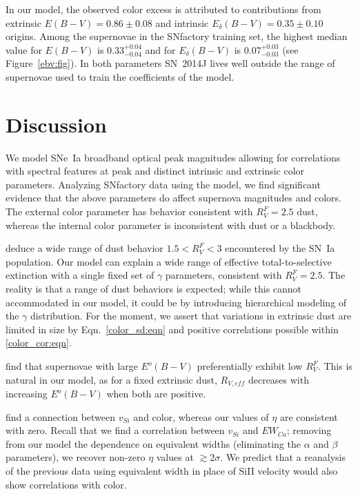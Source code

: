 \documentclass{aastex}   	%
\begin{document}
In our model, the observed color excess is attributed to contributions from extrinsic
$E(B-V)=  0.86 \pm   0.08$ and intrinsic $E_\delta(B-V)=  0.35 \pm   0.10$ origins.
Among the supernovae in the SNfactory training set, the highest median value for 
$E(B-V)$ is $  0.33^{  +0.04}_{ -0.04}$ and for $E_\delta(B-V)$ is
$  0.07^{  +0.03}_{ -0.03}$ 
(see Figure~\ref{ebv:fig}).
In both parameters SN~2014J lives well outside the range of supernovae used to train the coefficients of the model.

\section{Discussion}
\label{discussion:sec}
We model SNe~Ia broadband optical peak magnitudes allowing for correlations with spectral features at peak and distinct intrinsic and
extrinsic color parameters.  Analyzing SNfactory data using the model, we find significant evidence that the above parameters do
affect supernova magnitudes and colors.  The external color parameter has behavior consistent with $R^F_V=2.5$ \citet{1999PASP..111...63F} dust,
whereas the internal color parameter is inconsistent with dust or a blackbody.

\citet{2014ApJ...789...32B, 2015MNRAS.453.3300A} deduce a wide range of dust behavior $1.5<R^F_V<3$ encountered by the SN~Ia population.
Our model can explain a wide range of effective total-to-selective extinction with a single fixed set of $\gamma$ parameters, consistent
with $R^F_V=2.5$.  The reality is that a range of dust behaviors is expected; while this cannot accommodated in our model, it could be by
introducing hierarchical 
modeling of the $\gamma$ distribution.
For the moment, we assert that variations in extrinsic dust are limited in
size by Eqn.~\ref{color_sd:eqn} and positive correlations possible within \ref{color_cor:eqn}.


\citet{2011ApJ...729...55F, 2014ApJ...789...32B, 2015MNRAS.453.3300A} find that supernovae with large $E^o(B-V)$ 
preferentially exhibit low $R^F_V$.  This is natural in our model, as for a fixed extrinsic dust, $R_{V,eff}$ decreases with increasing $E^o(B-V)$ when
both are positive.


\citet{2009ApJ...699L.139W, 2011ApJ...729...55F} find a connection between $v_{Si}$ and color, whereas
our values of $\eta$ are consistent with zero.  Recall that we find a correlation between $v_{Si}$ and $EW_{Ca}$;
removing from our model the dependence on equivalent widths (eliminating the  $\alpha$ and $\beta$ parameters), we recover
non-zero $\eta$ values at  $\gtrsim 2\sigma$.  We  predict that a reanalysis of the previous data using equivalent width in place
of SiII velocity would also show correlations with color.
\end{document}
